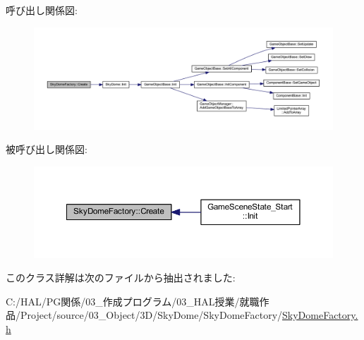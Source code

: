 呼び出し関係図\+:\nopagebreak
\begin{figure}[H]
\begin{center}
\leavevmode
\includegraphics[width=350pt]{class_sky_dome_factory_a70f27fa64d7cbd5164fc44de566a1683_cgraph}
\end{center}
\end{figure}
被呼び出し関係図\+:\nopagebreak
\begin{figure}[H]
\begin{center}
\leavevmode
\includegraphics[width=350pt]{class_sky_dome_factory_a70f27fa64d7cbd5164fc44de566a1683_icgraph}
\end{center}
\end{figure}


このクラス詳解は次のファイルから抽出されました\+:\begin{DoxyCompactItemize}
\item 
C\+:/\+H\+A\+L/\+P\+G関係/03\+\_\+作成プログラム/03\+\_\+\+H\+A\+L授業/就職作品/\+Project/source/03\+\_\+\+Object/3\+D/\+Sky\+Dome/\+Sky\+Dome\+Factory/\mbox{\hyperlink{_sky_dome_factory_8h}{Sky\+Dome\+Factory.\+h}}\end{DoxyCompactItemize}
